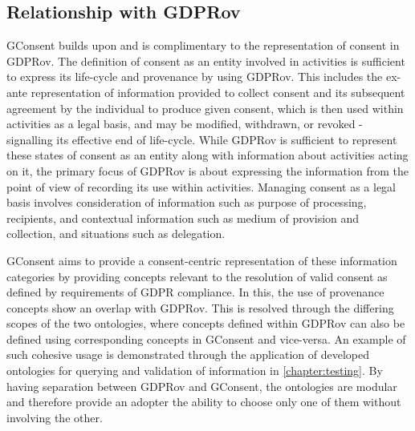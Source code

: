 \subsection{Relationship with GDPRov}
GConsent builds upon and is complimentary to the representation of consent in GDPRov.
The definition of consent as an entity involved in activities is sufficient to express its life-cycle and provenance by using GDPRov. This includes the ex-ante representation of information provided to collect consent and its subsequent agreement by the individual to produce given consent, which is then used within activities as a legal basis, and may be modified, withdrawn, or revoked - signalling its effective end of life-cycle.
While GDPRov is sufficient to represent these states of consent as an entity along with information about activities acting on it, the primary focus of GDPRov is about expressing the information from the point of view of recording its use within activities.
Managing consent as a legal basis involves consideration of information such as purpose of processing, recipients, and contextual information such as medium of provision and collection, and situations such as delegation.

GConsent aims to provide a consent-centric representation of these information categories by providing concepts relevant to the resolution of valid consent as defined by requirements of GDPR compliance. In this, the use of provenance concepts show an overlap with GDPRov.
This is resolved through the differing scopes of the two ontologies, where concepts defined within GDPRov can also be defined using corresponding concepts in GConsent and vice-versa. An example of such cohesive usage is demonstrated through the application of developed ontologies for querying and validation of information in \autoref{chapter:testing}.
By having separation between GDPRov and GConsent, the ontologies are modular and therefore provide an adopter the ability to choose only one of them without involving the other.

